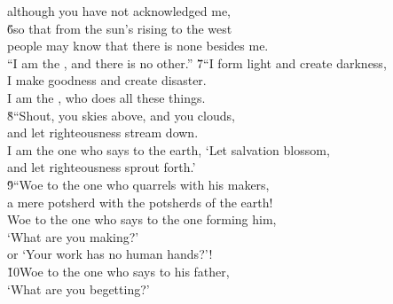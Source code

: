 \begin{poetry}
\poemll    although you have not acknowledged me, \\
\poeml \v{6}so that from the sun's rising to the west \\
\poemll    people may know that there is none besides me. \\
\poeml ``I am the , and there is no other.''
\poeml \v{7}``I form light and create darkness, \\
\poeml I make goodness and create disaster. \\
\poemll    I am the , who does all these things. \\
\poeml \v{8}``Shout, you skies above, and you clouds, \\
\poemll    and let righteousness stream down. \\
\poeml I am the one who says to the earth, `Let salvation blossom, \\
\poemll    and let righteousness sprout forth.' \\
\poeml \v{9}``Woe to the one who quarrels with his makers, \\
\poemll    a mere potsherd with the potsherds of the earth! \\
\poeml Woe to the one who says to the one forming him, \\
\poemll    `What are you making?' \\
\poemlll       or `Your work has no human hands?'! \\
\poeml \v{10}Woe to the one who says to his father, \\
\poemll    `What are you begetting?' \\

\end{poetry}
